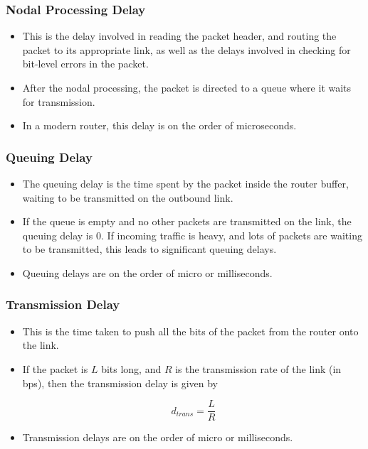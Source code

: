 \documentclass{article}
\theoremstyle{plain}
\theoremstyle{definition}
\begin{document}
\subsubsection{Nodal Processing Delay}
\begin{itemize}
    \item This is the delay involved in reading the packet header, and routing the packet to its appropriate link, as well as the delays involved in checking for bit-level errors in the packet.
    
    \item After the nodal processing, the packet is directed to a queue where it waits for transmission.
    
    \item In a modern router, this delay is on the order of microseconds. 
\end{itemize}

\subsubsection{Queuing Delay}
\begin{itemize}
    \item The queuing delay is the time spent by the packet inside the router buffer, waiting to be transmitted on the outbound link. 
    
    \item If the queue is empty and no other packets are transmitted on the link, the queuing delay is 0. If incoming traffic is heavy, and lots of packets are waiting to be transmitted, this leads to significant queuing delays.
    
    \item Queuing delays are on the order of micro or milliseconds. 
\end{itemize}

\subsubsection{Transmission Delay}
\begin{itemize}
    \item This is the time taken to push all the bits of the packet from the router onto the link.
    
    \item If the packet is $L$ bits long, and $R$ is the transmission rate of the link (in bps), then the transmission delay is given by 
    
    \begin{equation}
        d_{trans} = \frac{L}{R}
    \end{equation}
    
    \item Transmission delays are on the order of micro or milliseconds.
\end{itemize}
\end{document}
